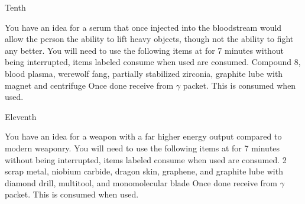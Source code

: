 \documentclass[greennotebook]{guildcamp3} %
\begin{document}
\begin{page}{Tenth}
	
	You have an idea for a serum that once injected into the bloodstream would allow the person the ability to lift heavy objects, though not the ability to fight any better.
	You will need to use the following items at \sSciWorkbench{} for 7 minutes without being interrupted, items labeled consume when used are consumed.
	Compound 8, blood plasma, werewolf fang, partially stabilized zirconia, graphite lube with magnet and centrifuge
	Once done receive \iSteroids{} from $\gamma$ packet. This is consumed when used. 
	
\end{page}

\begin{page}{Eleventh}
	
	You have an idea for a weapon with a far higher energy output compared to modern weaponry.
	You will need to use the following items at \sSciWorkbench{} for 7 minutes without being interrupted, items labeled consume when used are consumed.
	2 scrap metal, niobium carbide, dragon skin, graphene, and graphite lube with diamond drill, multitool, and monomolecular blade
	Once done receive \iUpgradedTechGun{} from $\gamma$ packet. This is consumed when used. 
	
\end{page}




\endnotebook
\end{document}
